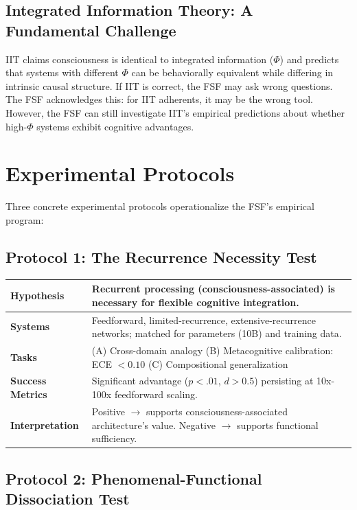 \documentclass[12pt,a4paper]{article}
\begin{document}
\subsection{Integrated Information Theory: A Fundamental Challenge}

IIT claims consciousness is identical to integrated information ($\Phi$) and predicts that systems with different $\Phi$ can be behaviorally equivalent while differing in intrinsic causal structure. If IIT is correct, the FSF may ask wrong questions. The FSF acknowledges this: for IIT adherents, it may be the wrong tool. However, the FSF can still investigate IIT's empirical predictions about whether high-$\Phi$ systems exhibit cognitive advantages.

\section{Experimental Protocols}

Three concrete experimental protocols operationalize the FSF's empirical program:

\subsection*{Protocol 1: The Recurrence Necessity Test}

\begin{longtable}{>{\raggedright\arraybackslash}p{}>{\raggedright\arraybackslash}p{}}
\toprule
\textbf{Hypothesis} & Recurrent processing (consciousness-associated) is necessary for flexible cognitive integration. \\
\midrule
\textbf{Systems} & Feedforward, limited-recurrence, extensive-recurrence networks; matched for parameters (10B) and training data. \\
\midrule
\textbf{Tasks} & (A) Cross-domain analogy (B) Metacognitive calibration: ECE $< 0.10$ (C) Compositional generalization \\
\midrule
\textbf{Success Metrics} & Significant advantage ($p < .01$, $d > 0.5$) persisting at 10x-100x feedforward scaling. \\
\midrule
\textbf{Interpretation} & Positive $\rightarrow$ supports consciousness-associated architecture's value. Negative $\rightarrow$ supports functional sufficiency. \\
\bottomrule
\end{longtable}

\subsection*{Protocol 2: Phenomenal-Functional Dissociation Test}
\end{document}
